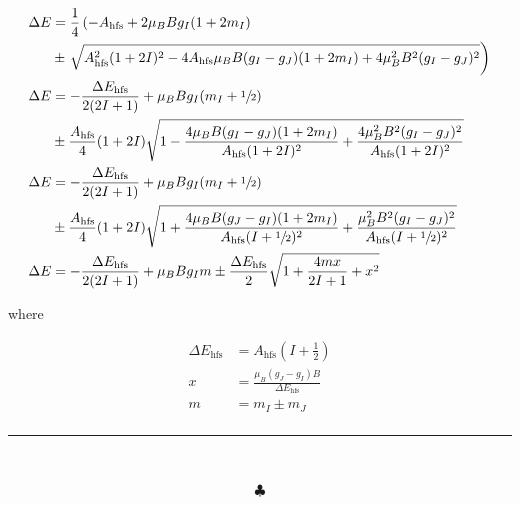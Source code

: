\documentclass[]{article}
\begin{document}
\begin{enumerate}[1)]
\begin{equation}
\begin{split}
\Delta E & = \frac{1}{4} \left( -A_\text{hfs} + 2\mu_B B g_I (1 + 2m_I) \right.  \\ & \pm \left. \sqrt{ A_\text{hfs}^2(1+2I  )^2 - 4A_\text{hfs} \mu_B B (g_I - g_J)(1+2m_I) + 4 \mu_B^2 B^2 (g_I - g_J)^2 }   \right)\\
\Delta E & =  - \frac{ \Delta E_\text{hfs} }{2(2I+1) } + \mu_B B g_I (m_I + \sfrac{1}{2})  \\ & \pm \frac{A_\text{hfs}}{4} (1+2I) \sqrt{ 1 - \frac{ 4\mu_B B (g_I - g_J)(1+2m_I) }{ A_\text{hfs} (1+2I)^2} + \frac{ 4 \mu_B^2 B^2 (g_I - g_J)^2}{ A_\text{hfs} (1+2I)^2   } }  \\
\Delta E & =  - \frac{ \Delta E_\text{hfs} }{2(2I+1) } + \mu_B B g_I (m_I + \sfrac{1}{2})  \\ & \pm \frac{A_\text{hfs}}{4} (1+2I) \sqrt{ 1 + \frac{ 4 \mu_B B (g_J - g_I)(1+2m_I) }{ A_\text{hfs} (I + \sfrac{1}{2})^2} + \frac{ \mu_B^2 B^2 (g_I - g_J)^2}{  A_\text{hfs} (I + \sfrac{1}{2})^2   } } \\
\Delta E & =  - \frac{ \Delta E_\text{hfs} }{2(2I+1) } + \mu_B B g_I m  \pm  \frac{\Delta E_\text{hfs} }{2} \sqrt{ 1 + \frac{ 4 mx }{ 2I+1} + x^2  }  \\
\end{split}
\end{equation}

where 

\begin{equation}
\begin{split}
\Delta E_\text{hfs} & = A_\text{hfs} \left( I + \frac{1}{2} \right) \\
x & = \frac{\mu_B (g_J - g_I)B}{  \Delta E_\text{hfs}} \\
m & = m_I \pm m_J \\
\end{split}
\end{equation}







\end{enumerate}


\begin{center}
\noindent\rule{15cm}{0.4pt} \\
\end{center}
$$\clubsuit$$
\end{document}

